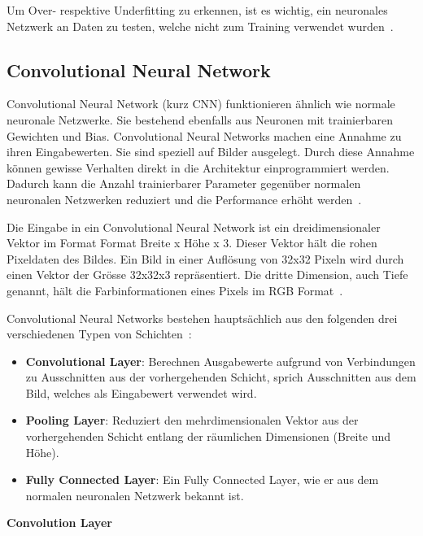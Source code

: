 Um Over- respektive Underfitting zu erkennen, ist es wichtig, ein neuronales Netzwerk an Daten zu testen, welche nicht zum Training verwendet wurden~\autocite{Krogh2008}.

\subsection{Convolutional Neural Network}
\label{chap:cnn}

Convolutional Neural Network (kurz CNN) funktionieren ähnlich wie normale neuronale Netzwerke. Sie bestehend ebenfalls aus Neuronen mit trainierbaren Gewichten und Bias. Convolutional Neural Networks machen eine Annahme zu ihren Eingabewerten. Sie sind speziell auf Bilder ausgelegt. Durch diese Annahme können gewisse Verhalten direkt in die Architektur einprogrammiert werden. Dadurch kann die Anzahl trainierbarer Parameter gegenüber normalen neuronalen Netzwerken reduziert und die Performance erhöht werden~\autocite{CNN}.

Die Eingabe in ein Convolutional Neural Network ist ein dreidimensionaler Vektor im Format Format Breite x Höhe x 3. Dieser Vektor hält die rohen Pixeldaten des Bildes. Ein Bild in einer Auflösung von 32x32 Pixeln wird durch einen Vektor der Grösse 32x32x3 repräsentiert. Die dritte Dimension, auch Tiefe genannt, hält die Farbinformationen eines Pixels im RGB Format~\autocite{CNN}.

Convolutional Neural Networks bestehen hauptsächlich aus den folgenden drei verschiedenen Typen von Schichten~\autocite{CNN}:

\begin{itemize}
    \item \textbf{Convolutional Layer}: Berechnen Ausgabewerte aufgrund von Verbindungen zu Ausschnitten aus der vorhergehenden Schicht, sprich Ausschnitten aus dem Bild, welches als Eingabewert verwendet wird.
    \item \textbf{Pooling Layer}: Reduziert den mehrdimensionalen Vektor aus der vorhergehenden Schicht entlang der räumlichen Dimensionen (Breite und Höhe).
    \item \textbf{Fully Connected Layer}: Ein Fully Connected Layer, wie er aus dem normalen neuronalen Netzwerk bekannt ist.
\end{itemize}

\textbf{Convolution Layer}

\nopagebreak

